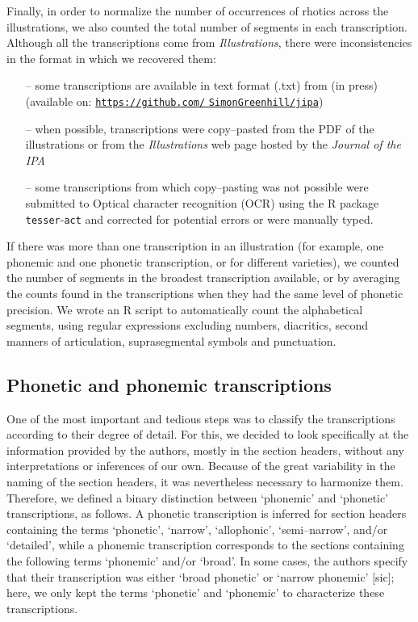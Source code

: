 Finally, in order to normalize the number of occurrences of rhotics across the illustrations, we also counted the total number of segments in each transcription. Although all the transcriptions come from \textit{Illustrations}, there were inconsistencies in the format in which we recovered them:

\begin{itemize}
	\item[–] some transcriptions are available in text format (.txt) from \citeauthor{bairdBlowingWindUsing2021} (in press) (available on: \href{https://github.com/SimonGreenhill/jipa}{\texttt{https://github.com/} \texttt{SimonGreenhill/jipa}})
	\item[–] when possible, transcriptions were copy–pasted from the PDF of the illustrations or from the \textit{Illustrations} web page hosted by the \textit{Journal of the IPA}
	\item[–] some transcriptions from which copy–pasting was not possible were submitted to Optical character recognition (OCR) using the R package \texttt{tesser}-\texttt{act} \parencite{ooms2019tesseract} and corrected for potential errors or were manually typed.
\end{itemize}

If there was more than one transcription in an illustration (for example, one phonemic and one phonetic transcription, or for different varieties), we counted  the number of segments in the broadest transcription available, or by averaging the counts found in the transcriptions when they had the same level of phonetic precision. We wrote an R script to automatically count the alphabetical segments, using regular expressions excluding numbers, diacritics, second manners of articulation, suprasegmental symbols and punctuation.

\subsection{Phonetic and phonemic transcriptions}\label{subsec:pht_phm}

One of the most important and tedious steps was to classify the transcriptions according to their degree of detail. For this, we decided to look specifically at the information provided by the authors, mostly in the section headers, without any interpretations or inferences of our own. Because of the great variability in the naming of the section headers, it was nevertheless necessary to harmonize them. Therefore, we defined a binary distinction between ‘phonemic’ and ‘phonetic’ transcriptions, as follows. A phonetic transcription is inferred for section headers containing the terms ‘phonetic’, ‘narrow’, ‘allophonic’, ‘semi–narrow’, and/or ‘detailed’, while a phonemic transcription corresponds to the sections containing the following terms ‘phonemic’ and/or ‘broad’. In some cases, the authors specify that their transcription was either ‘broad phonetic’ or ‘narrow phonemic’ [sic]; here, we only kept the terms ‘phonetic’ and ‘phonemic’ to characterize these transcriptions.\\

